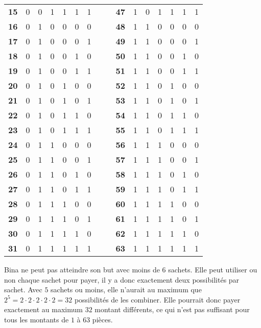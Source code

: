 {{\begin{samepage}
{\begin{tabular}{ @{} c c c c c c c l l c c c c c c c @{} }
  \textbf{15} & 0 & 0 & 1 & 1 & 1 & 1 &  &  & \textbf{47} & 1 & 0 & 1 & 1 & 1 & 1 \\ 
  \textbf{16} & 0 & 1 & 0 & 0 & 0 & 0 &  &  & \textbf{48} & 1 & 1 & 0 & 0 & 0 & 0 \\ 
  \textbf{17} & 0 & 1 & 0 & 0 & 0 & 1 &  &  & \textbf{49} & 1 & 1 & 0 & 0 & 0 & 1 \\ 
  \textbf{18} & 0 & 1 & 0 & 0 & 1 & 0 &  &  & \textbf{50} & 1 & 1 & 0 & 0 & 1 & 0 \\ 
  \textbf{19} & 0 & 1 & 0 & 0 & 1 & 1 &  &  & \textbf{51} & 1 & 1 & 0 & 0 & 1 & 1 \\ 
  \textbf{20} & 0 & 1 & 0 & 1 & 0 & 0 &  &  & \textbf{52} & 1 & 1 & 0 & 1 & 0 & 0 \\ 
  \textbf{21} & 0 & 1 & 0 & 1 & 0 & 1 &  &  & \textbf{53} & 1 & 1 & 0 & 1 & 0 & 1 \\ 
  \textbf{22} & 0 & 1 & 0 & 1 & 1 & 0 &  &  & \textbf{54} & 1 & 1 & 0 & 1 & 1 & 0 \\ 
  \textbf{23} & 0 & 1 & 0 & 1 & 1 & 1 &  &  & \textbf{55} & 1 & 1 & 0 & 1 & 1 & 1 \\ 
  \textbf{24} & 0 & 1 & 1 & 0 & 0 & 0 &  &  & \textbf{56} & 1 & 1 & 1 & 0 & 0 & 0 \\ 
  \textbf{25} & 0 & 1 & 1 & 0 & 0 & 1 &  &  & \textbf{57} & 1 & 1 & 1 & 0 & 0 & 1 \\ 
  \textbf{26} & 0 & 1 & 1 & 0 & 1 & 0 &  &  & \textbf{58} & 1 & 1 & 1 & 0 & 1 & 0 \\ 
  \textbf{27} & 0 & 1 & 1 & 0 & 1 & 1 &  &  & \textbf{59} & 1 & 1 & 1 & 0 & 1 & 1 \\ 
  \textbf{28} & 0 & 1 & 1 & 1 & 0 & 0 &  &  & \textbf{60} & 1 & 1 & 1 & 1 & 0 & 0 \\ 
  \textbf{29} & 0 & 1 & 1 & 1 & 0 & 1 &  &  & \textbf{61} & 1 & 1 & 1 & 1 & 0 & 1 \\ 
  \textbf{30} & 0 & 1 & 1 & 1 & 1 & 0 &  &  & \textbf{62} & 1 & 1 & 1 & 1 & 1 & 0 \\ 
  \textbf{31} & 0 & 1 & 1 & 1 & 1 & 1 &  &  & \textbf{63} & 1 & 1 & 1 & 1 & 1 & 1
\end{tabular}

\par}


\end{samepage}

Bina ne peut pas atteindre son but avec moins de $6$ sachets. Elle peut utiliser ou non chaque sachet pour payer, il y a donc exactement deux possibilités par sachet. Avec $5$ sachets ou moins, elle n’aurait au maximum que ${2^5 = 2 \cdot 2 \cdot 2 \cdot 2 \cdot 2 = 32}$ possibilités de les combiner. Elle pourrait donc payer exactement au maximum $32$ montant différents, ce qui n’est pas suffisant pour tous les montants de $1$ à $63$ pièces.



}}
